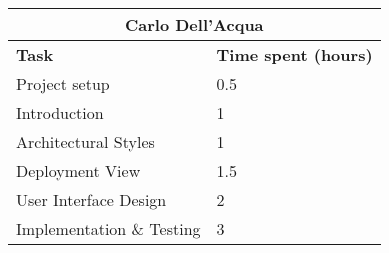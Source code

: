 \begin{table}[h]
  \centering
  \begin{tabular}{l|l}
    \multicolumn{2}{c}{\textbf{Carlo Dell'Acqua}} \\
    \hline
    \textbf{Task} & \textbf{Time spent (hours)}\\
    \hline
    Project setup & 0.5 \\
    Introduction & 1 \\
    Architectural Styles & 1 \\
    Deployment View & 1.5 \\
    User Interface Design & 2 \\
    Implementation \& Testing & 3 \\
  \end{tabular}
\end{table}